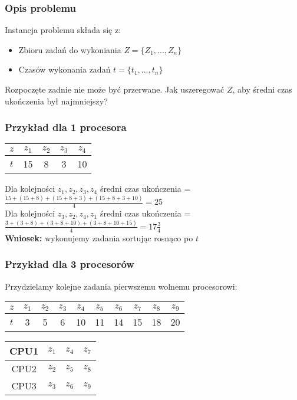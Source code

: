\subsubsection{Opis problemu}
Instancja problemu składa się z:
\begin{itemize}
	\item Zbioru zadań do wykoniania $Z= \{ Z_1,...,Z_n \}$
    \item Czasów wykonania zadań $t = \{ t_1,...,t_n\}$
\end{itemize}
Rozpoczęte zadnie nie może być przerwane.
Jak uszeregować $Z$, aby średni czas ukończenia był najmniejszy?

\subsubsection{Przykład dla 1 procesora}
\begin{center}
\begin{tabular}{ c | c | c | c | c }
  $z$ & $z_1$	& $z_2$ & $z_3$ & $z_4$ \\ \hline
  $t$ & 15 		&  8 	& 3 	& 10 \\ 
\end{tabular}
\end{center}
Dla kolejności $z_1, z_2, z_3, z_4$ średni czas ukończenia = $\frac{15+(15+8)+(15+8+3)+(15+8+3+10)}{4}= 25$ \\
Dla kolejności $z_3, z_2, z_4, z_1$ średni czas ukończenia = $\frac{3+(3+8)+(3+8+10)+(3+8+10+15)}{4} = 17\frac{3}{4}$ \\

\textbf{Wniosek:} wykonujemy zadania sortując rosnąco po $t$ 

\subsubsection{Przykład dla 3 procesorów}
Przydzielamy kolejne zadania pierwszemu wolnemu procesorowi:
\begin{center}
\begin{tabular}{ c | c | c | c | c | c | c | c | c | c } 
  $z$ 	& $z_1$	& $z_2$ & $z_3$ & $z_4$	& $z_5$	& $z_6$ & $z_7$ & $z_8$	& $z_9$ \\ \hline
  $t$ 	& 3		& 5		& 6		& 10	& 11	& 14	& 15	& 18	& 20 \\ 
\end{tabular}
\end{center}

\begin{center}
\begin{tabular}{ c | c | c | c }
  CPU1 & $z_1$ & $z_4$ & $z_7$ \\ \hline
  CPU2 & $z_2$ & $z_5$ & $z_8$ \\ \hline
  CPU3 & $z_3$ & $z_6$ & $z_9$ \\
\end{tabular}
\end{center}

